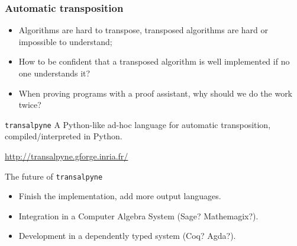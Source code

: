 \documentclass[10pt,usepdftitle=false]{beamer}
\begin{document}
\begin{frame}
  \frametitle{Automatic transposition}

  \begin{itemize}
  \item Algorithms are hard to transpose, transposed algorithms are
    hard or impossible to understand;
  \item How to be confident that a transposed algorithm is well
    implemented if no one understands it?
  \item When proving programs with a proof assistant, why should we do
    the work twice?
  \end{itemize}

  \begin{block}{\texttt{transalpyne}}
    A Python-like ad-hoc language for automatic transposition,
    compiled/interpreted in Python.

    \begin{center}
      \url{http://transalpyne.gforge.inria.fr/}
    \end{center}
  \end{block}

  \begin{block}{The future of \texttt{transalpyne}}
    \begin{itemize}
    \item Finish the implementation, add more output languages.
    \item Integration in a Computer Algebra System (Sage?
      Mathemagix?).
    \item Development in a dependently typed system (Coq? Agda?).
    \end{itemize}
  \end{block}
\end{frame}

\end{document}
